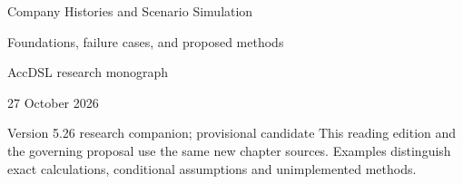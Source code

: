 \documentclass[11pt,a4paper]{report}
\begin{document}
\hypersetup{pageanchor=false}
\begin{titlepage}
{\Huge Company Histories and Scenario Simulation\par}
\vspace{12mm}
{\Large Foundations, failure cases, and proposed methods\par}
\vspace{8mm}
AccDSL research monograph\par 27 October 2026\par Version 5.26 research companion; provisional candidate
\vfill
This reading edition and the governing proposal use the same new chapter sources. Examples distinguish exact calculations, conditional assumptions and unimplemented methods.
\end{titlepage}
\hypersetup{pageanchor=true}
\tableofcontents
\clearpage{}


























\clearpage\label{sim:body-end}

\begingroup\raggedright
\endgroup
\end{document}
